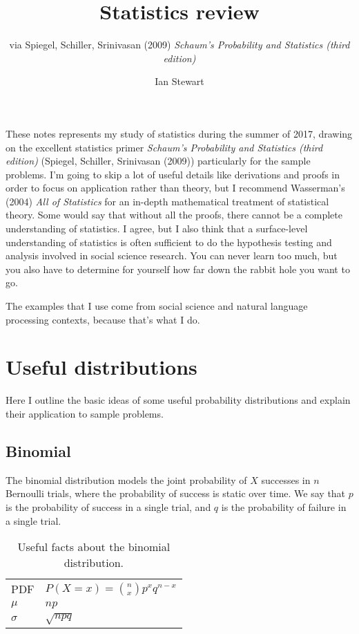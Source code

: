 \documentclass[11pt,letterpaper]{scrartcl}
\title{Statistics review}
\subtitle{via Spiegel, Schiller, Srinivasan (2009) \emph{Schaum's Probability and Statistics (third edition)}}
\author{Ian Stewart}
\begin{document}
\maketitle{}
\date{}

These notes represents my study of statistics during the summer of 2017, drawing on the excellent statistics primer \emph{Schaum's Probability and Statistics (third edition)} (Spiegel, Schiller, Srinivasan (2009)) particularly for the sample problems.
I'm going to skip a lot of useful details like derivations and proofs in order to focus on application rather than theory, but I recommend Wasserman's (2004) \emph{All of Statistics} for an in-depth mathematical treatment of statistical theory.
Some would say that without all the proofs, there cannot be a complete understanding of statistics.
I agree, but I also think that a surface-level understanding of statistics is often sufficient to do the hypothesis testing and analysis involved in social science research.
You can never learn too much, but you also have to determine for yourself how far down the rabbit hole you want to go.

The examples that I use come from social science and natural language processing contexts, because that's what I do.

\section{Useful distributions}

Here I outline the basic ideas of some useful probability distributions and explain their application to sample problems.

\subsection{Binomial}

The binomial distribution models the joint probability of $X$ successes in $n$ Bernoulli trials, where the probability of success is static over time. 
We say that $p$ is the probability of success in a single trial, and $q$ is the probability of failure in a single trial.

\begin{table}[h!]
\centering
\begin{tabular}{l l} \hline
PDF & $P(X=x)=\binom{n}{x}p^{x}q^{n-x}$ \\
$\mu $ & $np$ \\
$\sigma $ & $\sqrt{npq}$ \\ \hline
\end{tabular}
\caption{Useful facts about the binomial distribution.}
\label{tab:binomial}
\end{table}
\end{document}
